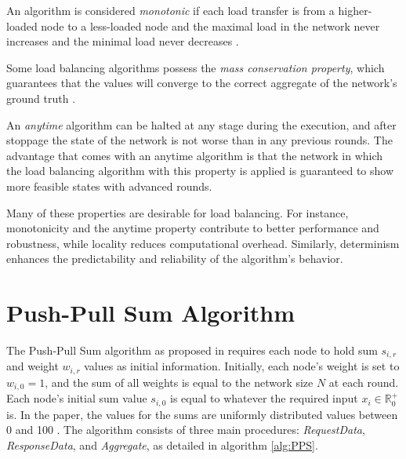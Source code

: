 \begin{definition}
    An algorithm is considered \textit{monotonic} if each load transfer is from a higher-loaded node to a less-loaded node and the maximal load in the network never increases and the minimal load never decreases \cite{Dinitz2023DAB}.
\end{definition}

\begin{definition}
    Some load balancing algorithms possess the \textit{mass conservation property}, which guarantees that the values will converge to the correct aggregate of the network's ground truth \cite{nugroho2023PushPullSumDataAg}.
\end{definition}

\begin{definition}
    An \textit{anytime} algorithm can be halted at any stage during the execution, and after stoppage the state of the network is not worse than in any previous rounds. The advantage that comes with an anytime algorithm is that the network in which the load balancing algorithm with this property is applied is guaranteed to show more feasible states with advanced rounds. \cite{Dinitz2023DAB}
\end{definition}

Many of these properties are desirable for load balancing. For instance, monotonicity and the anytime property contribute to better performance and robustness, while locality reduces computational overhead. Similarly, determinism enhances the predictability and reliability of the algorithm's behavior.

\section{Push-Pull Sum Algorithm}\label{sec:classicPPS}
The Push-Pull Sum algorithm as proposed in \cite{nugroho2023PushPullSumDataAg} requires each node to hold sum $s_{i,r}$ and weight $w_{i,r}$ values as initial information. Initially, each node's weight is set to $w_{i,0} = 1$, and the sum of all weights is equal to the network size $N$ at each round. Each node's initial sum value $s_{i,0}$ is equal to whatever the required input $x_i \in \mathbb{R}^{+}_{0}$ is. In the paper, the values for the sums are uniformly distributed values between 0 and 100 \cite{nugroho2023PushPullSumDataAg}. The algorithm consists of three main procedures: \textit{RequestData}, \textit{ResponseData}, and \textit{Aggregate}, as detailed in algorithm \ref{alg:PPS}.

